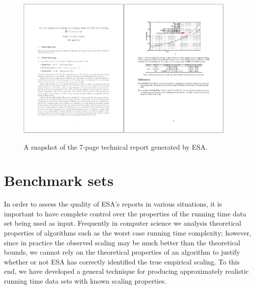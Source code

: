 \documentclass[aic]{iosart2x}
\begin{document}
\begin{figure}[t]
\begin{centering}
\includegraphics[width=0.48\textwidth]{ESA_output_1}\includegraphics[width=0.48\textwidth]{ESA_output_2}
\par\end{centering}

\caption{A snapshot of the 7-page technical report generated by ESA.}\label{fig:Snapshot-ESA-output}
\end{figure}

\section{Benchmark sets}
\label{sec:AA}

In order to assess the quality of ESA's reports in various situations, it is important to have complete control over the properties of the running time data set being used as input. Frequently in computer science we analysis theoretical properties of algorithms such as the worst case running time complexity; however, since in practice the observed scaling may be much better than the theoretical bounds, we cannot rely on the theoretical properties of an algorithm to justify whether or not ESA has correctly identified the true empirical scaling. To this end, we have developed a general technique for producing approximately realistic running time data sets with known scaling properties.
\end{document}
